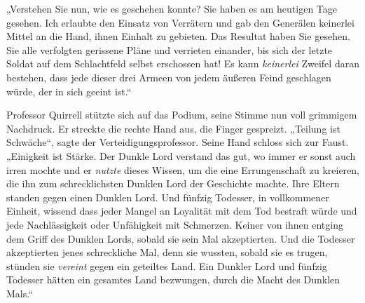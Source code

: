 „Verstehen Sie nun, wie es geschehen konnte? Sie haben es am heutigen Tage gesehen. Ich erlaubte den Einsatz von Verrätern und gab den Generälen keinerlei Mittel an die Hand, ihnen Einhalt zu gebieten. Das Resultat haben Sie gesehen. Sie alle verfolgten gerissene Pläne und verrieten einander, bis sich der letzte Soldat auf dem Schlachtfeld selbst erschossen hat! Es kann \emph{keinerlei} Zweifel daran bestehen, dass jede dieser drei Armeen von jedem äußeren Feind geschlagen würde, der in sich geeint ist.“

Professor Quirrell stützte sich auf das Podium, seine Stimme nun voll grimmigem Nachdruck. Er streckte die rechte Hand aus, die Finger gespreizt. „Teilung ist Schwäche“, sagte der Verteidigungsprofessor. Seine Hand schloss sich zur Faust. „Einigkeit ist Stärke. Der Dunkle Lord verstand das gut, wo immer er sonst auch irren mochte und er \emph{nutzte} dieses Wissen, um die eine Errungenschaft zu kreieren, die ihn zum schrecklichsten Dunklen Lord der Geschichte machte. Ihre Eltern standen gegen einen Dunklen Lord. Und fünfzig Todesser, in vollkommener Einheit, wissend dass jeder Mangel an Loyalität mit dem Tod bestraft würde und jede Nachlässigkeit oder Unfähigkeit mit Schmerzen. Keiner von ihnen entging dem Griff des Dunklen Lords, sobald sie sein Mal akzeptierten. Und die Todesser akzeptierten jenes schreckliche Mal, denn sie wussten, sobald sie es trugen, stünden sie \emph{vereint} gegen ein geteiltes Land. Ein Dunkler Lord und fünfzig Todesser hätten ein gesamtes Land bezwungen, durch die Macht des Dunklen Mals.“

